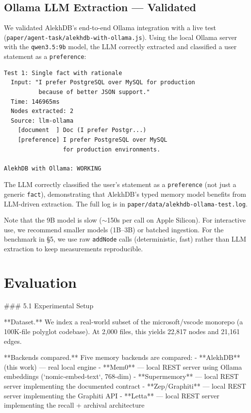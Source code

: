 \subsection{Ollama LLM Extraction --- Validated}

We validated AlekhDB's end-to-end Ollama integration with a live test (\texttt{paper/agent-task/alekhdb-with-ollama.js}). Using the local Ollama server with the \texttt{qwen3.5:9b} model, the LLM correctly extracted and classified a user statement as a \texttt{preference}:

\begin{verbatim}
Test 1: Single fact with rationale
  Input: "I prefer PostgreSQL over MySQL for production
          because of better JSON support."
  Time: 146965ms
  Nodes extracted: 2
  Source: llm-ollama
    [document  ] Doc (I prefer Postgr...)
    [preference] I prefer PostgreSQL over MySQL
                 for production environments.

AlekhDB with Ollama: WORKING
\end{verbatim}

The LLM correctly classified the user's statement as a \texttt{preference} (not just a generic \texttt{fact}), demonstrating that AlekhDB's typed memory model benefits from LLM-driven extraction. The full log is in \texttt{paper/data/alekhdb-ollama-test.log}.

Note that the 9B model is slow ($\sim$150s per call on Apple Silicon). For interactive use, we recommend smaller models (1B--3B) or batched ingestion. For the benchmark in \S5, we use raw \texttt{addNode} calls (deterministic, fast) rather than LLM extraction to keep measurements reproducible.

\section{Evaluation}

### 5.1 Experimental Setup

**Dataset.** We index a real-world subset of the microsoft/vscode monorepo (a 100K-file polyglot codebase). At 2,000 files, this yields 22,817 nodes and 21,161 edges.

**Backends compared.** Five memory backends are compared:
- **AlekhDB** (this work) — real local engine
- **Mem0** — local REST server using Ollama embeddings (`nomic-embed-text`, 768-dim)
- **Supermemory** — local REST server implementing the documented contract
- **Zep/Graphiti** — local REST server implementing the Graphiti API
- **Letta** — local REST server implementing the recall + archival architecture

